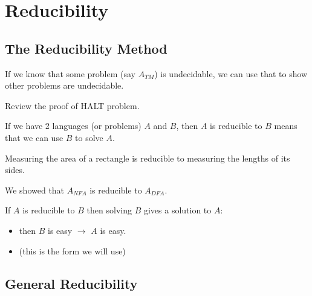 \chapter{Reducibility}

\section{The Reducibility Method}
If we know that some problem (say \(A_{TM}\)) is undecidable, we can use that to show other problems are undecidable.

\begin{remark}
    Review the proof of HALT problem.
\end{remark}

\begin{definition}[Reducibility]
    If we have 2 languages (or problems) \(A\) and \(B\), then \(A\) is reducible to \(B\) means that we can use \(B\) to solve \(A\).  
\end{definition}

\begin{example}
    Measuring the area of a rectangle is reducible to measuring the lengths of its sides.
\end{example}

\begin{example}
    We showed that \(A_{NFA}\) is reducible to \(A_{DFA}\). 
\end{example}


If \(A\) is reducible to \(B\) then solving \(B\) gives a solution to \(A\):
\begin{itemize}
    \item then \(B\) is easy \(\rightarrow\) \(A\) is easy.   
    \item {}  (this is the form we will use) 
\end{itemize}  


\section{General Reducibility}

